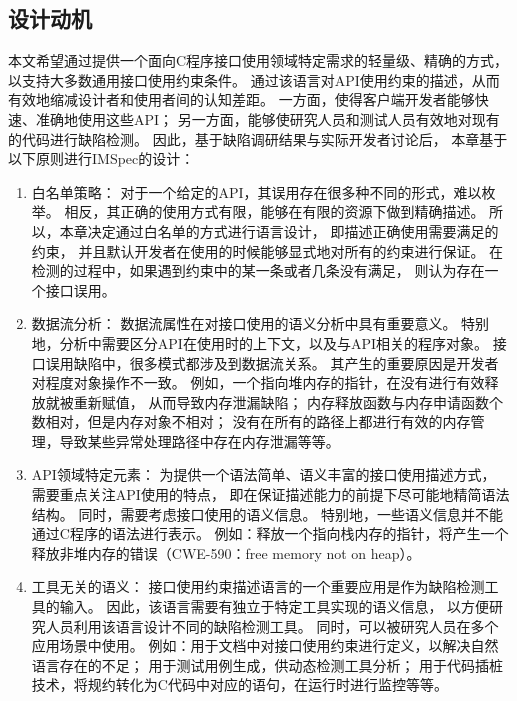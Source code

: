 \subsection{设计动机}
本文希望通过提供一个面向C程序接口使用领域特定需求的轻量级、精确的方式，
以支持大多数通用接口使用约束条件。
通过该语言对API使用约束的描述，从而有效地缩减设计者和使用者间的认知差距。
一方面，使得客户端开发者能够快速、准确地使用这些API；
另一方面，能够使研究人员和测试人员有效地对现有的代码进行缺陷检测。
因此，基于缺陷调研结果与实际开发者讨论后，
本章基于以下原则进行IMSpec的设计：
\begin{enumerate}
	\item 白名单策略：
	对于一个给定的API，其误用存在很多种不同的形式，难以枚举。
	相反，其正确的使用方式有限，能够在有限的资源下做到精确描述。
	所以，本章决定通过白名单的方式进行语言设计，
	即描述正确使用需要满足的约束，
	并且默认开发者在使用的时候能够显式地对所有的约束进行保证。
	在检测的过程中，如果遇到约束中的某一条或者几条没有满足，
	则认为存在一个接口误用。
	
	\item 数据流分析：
	数据流属性在对接口使用的语义分析中具有重要意义。
	特别地，分析中需要区分API在使用时的上下文，以及与API相关的程序对象。
	接口误用缺陷中，很多模式都涉及到数据流关系。
	其产生的重要原因是开发者对程度对象操作不一致。
	例如，一个指向堆内存的指针，在没有进行有效释放就被重新赋值，
	从而导致内存泄漏缺陷；
	内存释放函数与内存申请函数个数相对，但是内存对象不相对；
	没有在所有的路径上都进行有效的内存管理，导致某些异常处理路径中存在内存泄漏等等。
	
	\item API领域特定元素：
	为提供一个语法简单、语义丰富的接口使用描述方式，
	需要重点关注API使用的特点，
	即在保证描述能力的前提下尽可能地精简语法结构。
	同时，需要考虑接口使用的语义信息。
	特别地，一些语义信息并不能通过C程序的语法进行表示。
	例如：释放一个指向栈内存的指针，将产生一个释放非堆内存的错误（CWE-590：free memory not on heap）。
	
	\item 工具无关的语义：
	接口使用约束描述语言的一个重要应用是作为缺陷检测工具的输入。
	因此，该语言需要有独立于特定工具实现的语义信息，
	以方便研究人员利用该语言设计不同的缺陷检测工具。
	同时，可以被研究人员在多个应用场景中使用。
	例如：用于文档中对接口使用约束进行定义，以解决自然语言存在的不足；
	用于测试用例生成，供动态检测工具分析；
	用于代码插桩技术，将规约转化为C代码中对应的语句，在运行时进行监控等等。
\end{enumerate}


